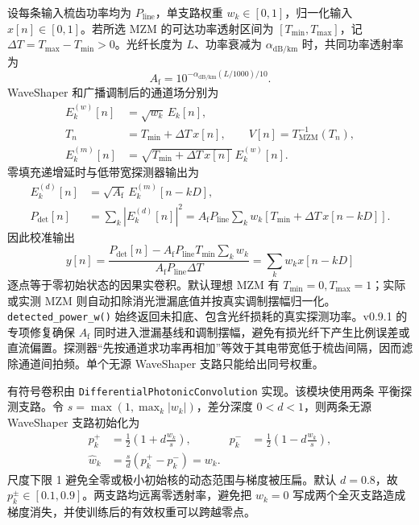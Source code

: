 \documentclass[11pt,a4paper,UTF8]{ctexart}
\newcommand{\pkg}[1]{\texttt{#1}}
\begin{document}
设每条输入梳齿功率均为 $P_{\mathrm{line}}$，单支路权重 $w_k\in[0,1]$，归一化输入 $x[n]\in[0,1]$。若所选 MZM 的可达功率透射区间为 $[T_{\min},T_{\max}]$，记 $\Delta T=T_{\max}-T_{\min}>0$。光纤长度为 $L$、功率衰减为 $\alpha_{\mathrm{dB/km}}$ 时，共同功率透射率为
\begin{equation}
A_{\mathrm f}=10^{-\alpha_{\mathrm{dB/km}}(L/1000)/10}.
\end{equation}
WaveShaper 和广播调制后的通道场分别为
\begin{align}
E_k^{(w)}[n]&=\sqrt{w_k}\,E_k[n],\\
T_n&=T_{\min}+\Delta T\,x[n],\qquad V[n]=T_{\mathrm{MZM}}^{-1}(T_n),\\
E_k^{(m)}[n]&=\sqrt{T_{\min}+\Delta T\,x[n]}\,E_k^{(w)}[n].
\end{align}
零填充递增延时与低带宽探测器输出为
\begin{align}
E_k^{(d)}[n]&=\sqrt{A_{\mathrm f}}\,E_k^{(m)}[n-kD],\\
P_{\mathrm{det}}[n]&=\sum_k\left|E_k^{(d)}[n]\right|^2
=A_{\mathrm f}P_{\mathrm{line}}\sum_k w_k\left[T_{\min}+\Delta T\,x[n-kD]\right].
\end{align}
因此校准输出
\begin{equation}
y[n]=\frac{P_{\mathrm{det}}[n]-A_{\mathrm f}P_{\mathrm{line}}T_{\min}\sum_kw_k}
{A_{\mathrm f}P_{\mathrm{line}}\Delta T}
=\sum_k w_kx[n-kD]
\end{equation}
逐点等于零初始状态的因果实卷积。默认理想 MZM 有 $T_{\min}=0,T_{\max}=1$；实际或实测 MZM 则自动扣除消光泄漏底值并按真实调制摆幅归一化。\pkg{detected\_power\_w()} 始终返回未扣底、包含光纤损耗的真实探测功率。v0.9.1 的专项修复确保 $A_{\mathrm f}$ 同时进入泄漏基线和调制摆幅，避免有损光纤下产生比例误差或直流偏置。探测器“先按通道求功率再相加”等效于其电带宽低于梳齿间隔，因而滤除通道间拍频。单个无源 WaveShaper 支路只能给出同号权重。

有符号卷积由 \pkg{DifferentialPhotonicConvolution} 实现。该模块使用两条
平衡探测支路。令
$s=\max(1,\max_k|w_k|)$，差分深度 $0<d<1$，则两条无源 WaveShaper 支路初始化为
\begin{align}
p_k^+&=\frac{1}{2}\left(1+d\frac{w_k}{s}\right), &
p_k^-&=\frac{1}{2}\left(1-d\frac{w_k}{s}\right),\\
\hat w_k&=\frac{s}{d}(p_k^+-p_k^-)=w_k.
\end{align}
尺度下限 1 避免全零或极小初始核的动态范围与梯度被压扁。默认 $d=0.8$，故 $p_k^\pm\in[0.1,0.9]$。两支路均远离零透射率，避免把
$w_k=0$ 写成两个全灭支路造成梯度消失，并使训练后的有效权重可以跨越零点。
\end{document}
